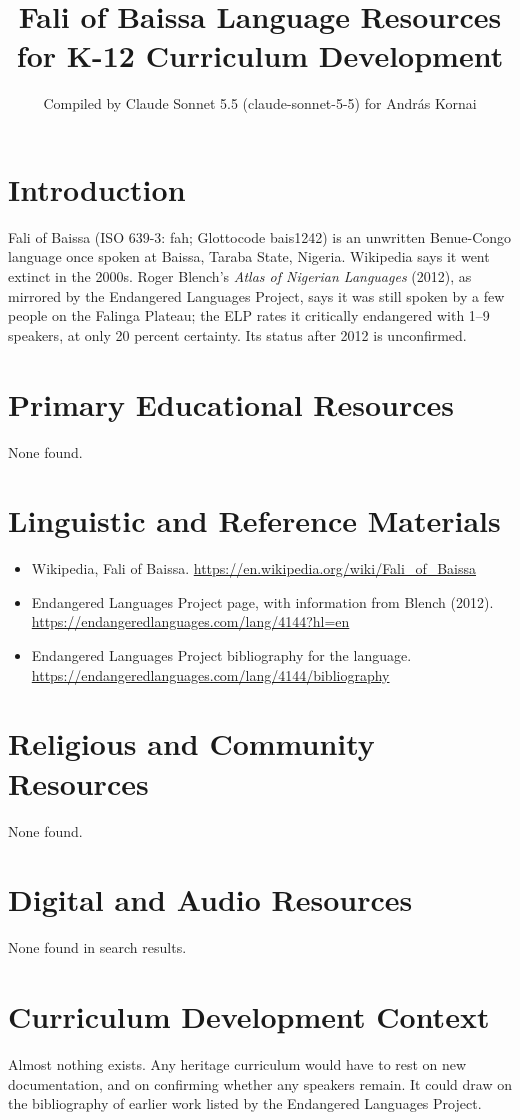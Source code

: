 \documentclass[12pt]{article}
\title{Fali of Baissa Language Resources for K-12 Curriculum Development}
\author{Compiled by Claude Sonnet 5.5 (claude-sonnet-5-5) for Andr\'as Kornai}
\date{}
\begin{document}
\maketitle

\section{Introduction}
Fali of Baissa (ISO 639-3: fah; Glottocode bais1242) is an unwritten Benue-Congo language once spoken at Baissa, Taraba State, Nigeria. Wikipedia says it went extinct in the 2000s. Roger Blench's \emph{Atlas of Nigerian Languages} (2012), as mirrored by the Endangered Languages Project, says it was still spoken by a few people on the Falinga Plateau; the ELP rates it critically endangered with 1--9 speakers, at only 20 percent certainty. Its status after 2012 is unconfirmed.

\section{Primary Educational Resources}
None found.

\section{Linguistic and Reference Materials}
\begin{itemize}
\item Wikipedia, Fali of Baissa. \url{https://en.wikipedia.org/wiki/Fali_of_Baissa}
\item Endangered Languages Project page, with information from Blench (2012). \url{https://endangeredlanguages.com/lang/4144?hl=en}
\item Endangered Languages Project bibliography for the language. \url{https://endangeredlanguages.com/lang/4144/bibliography}
\end{itemize}

\section{Religious and Community Resources}
None found.

\section{Digital and Audio Resources}
None found in search results.

\section{Curriculum Development Context}
Almost nothing exists. Any heritage curriculum would have to rest on new documentation, and on confirming whether any speakers remain. It could draw on the bibliography of earlier work listed by the Endangered Languages Project.
\end{document}
